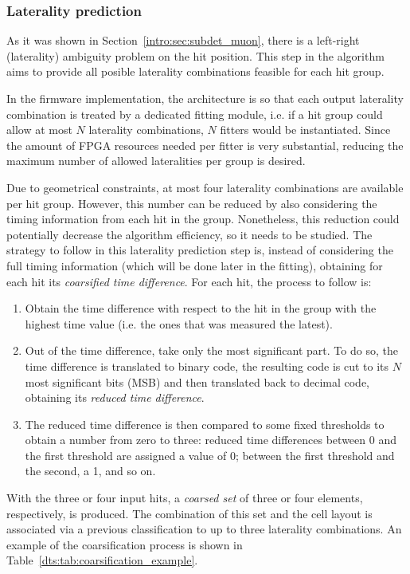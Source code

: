 \documentclass[../main.tex]{subfiles}
\begin{document}
\subsubsection*{Laterality prediction}

As it was shown in Section~\ref{intro:sec:subdet_muon}, there is a left-right (laterality) ambiguity problem on the hit position. This step in the algorithm aims to provide all posible laterality combinations feasible for each hit group. 

In the firmware implementation, the architecture is so that each output laterality combination is treated by a dedicated fitting module, i.e. if a hit group could allow at most $N$ laterality combinations, $N$ fitters would be instantiated. Since the amount of FPGA resources needed per fitter is very substantial, reducing the maximum number of allowed lateralities per group is desired.

Due to geometrical constraints, at most four laterality combinations are available per hit group. However, this number can be reduced by also considering the timing information from each hit in the group. Nonetheless, this reduction could potentially decrease the algorithm efficiency, so it needs to be studied. The strategy to follow in this laterality prediction step is, instead of considering the full timing information (which will be done later in the fitting), obtaining for each hit its \textit{coarsified time difference}. For each hit, the process to follow is:
\begin{enumerate}
\item Obtain the time difference with respect to the hit in the group with the highest time value (i.e. the ones that was measured the latest).
\item Out of the time difference, take only the most significant part. To do so, the time difference is translated to binary code, the resulting code is cut to its $N$ most significant bits (MSB) and then translated back to decimal code, obtaining its \textit{reduced time difference}.
\item The reduced time difference is then compared to some fixed thresholds to obtain a number from zero to three: reduced time differences between 0 and the first threshold are assigned a value of 0; between the first threshold and the second, a 1, and so on.
\end{enumerate}

With the three or four input hits, a \textit{coarsed set} of three or four elements, respectively, is produced. The combination of this set and the cell layout is associated via a previous classification to up to three laterality combinations. An example of the coarsification process is shown in Table~\ref{dts:tab:coarsification_example}.
\end{document}
